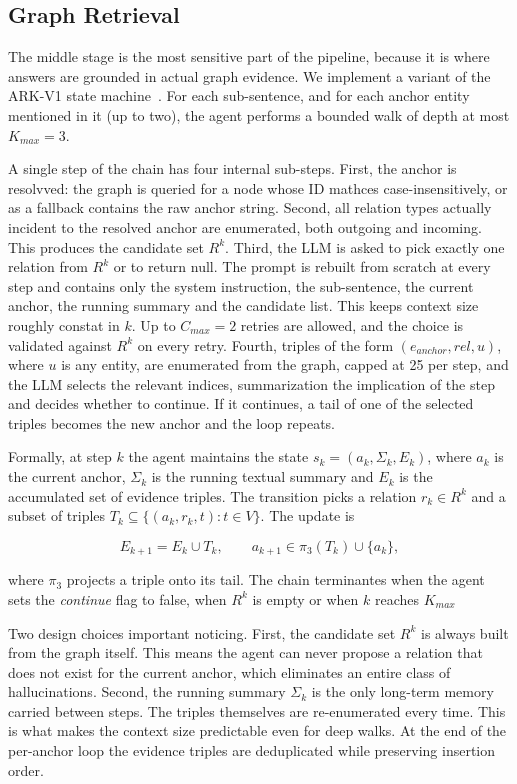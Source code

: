 \documentclass[conference]{IEEEtran}
\begin{document}
\subsection{Graph Retrieval}
The middle stage is the most sensitive part of the pipeline, because it is where answers are grounded in actual graph evidence. We implement a variant of the {ARK-V1 state machine}~\cite{arkv12025}. For each sub-sentence, and for each anchor entity mentioned in it (up to two), the agent performs a bounded walk of depth at most $K_{max} = 3$.

A single step of the chain has four internal sub-steps. First, the anchor is resolvved: the graph is queried for a node whose ID mathces case-insensitively, or as a fallback contains the raw anchor string. Second, all relation types actually incident to the resolved anchor are enumerated, both outgoing and incoming. This produces the candidate set $R^k$. Third, the LLM is asked to pick exactly one relation from $R^k$ or to return null. The prompt is rebuilt from scratch at every step and contains only the system instruction, the sub-sentence, the current anchor, the running summary and the candidate list. This keeps context size roughly constat in $k$. Up to $C_{max} = 2$ retries are allowed, and the choice is validated against $R^k$ on every retry. Fourth, triples of the form $(e_{anchor}, rel, u)$, where $u$ is any entity, are enumerated from the graph, capped at 25 per step, and the LLM selects the relevant indices, summarization the implication of the step and decides whether to continue. If it continues, a tail of one of the selected triples becomes the new anchor and the loop repeats.

Formally, at step $k$ the agent maintains the state $s_k = (a_k, \Sigma_k, E_k)$, where $a_k$ is the current anchor, $\Sigma_k$ is the running textual summary and $E_k$ is the accumulated set of evidence triples. The transition picks a relation $r_k \in R^k$ and a subset of triples $T_k \subseteq \{(a_k, r_k, t): t \in V\}$. The update is 

$$
E_{k+1} = E_k \cup T_k, \qquad a_{k+1} \in \pi_3(T_k) \cup \{a_k\},
$$

where $\pi_3$ projects a triple onto its tail. The chain terminantes when the agent sets the \textit{continue} flag to false, when $R^k$ is empty or when $k$ reaches $K_{max}$

Two design choices important noticing. First, the candidate set $R^k$ is always built from the graph itself. This means the agent can never propose a relation that does not exist for the current anchor, which eliminates an entire class of hallucinations. Second, the running summary $\Sigma_k$ is the only long-term memory carried between steps. The triples themselves are re-enumerated every time. This is what makes the context size predictable even for deep walks. At the end of the per-anchor loop the evidence triples are deduplicated while preserving insertion order.
\end{document}
